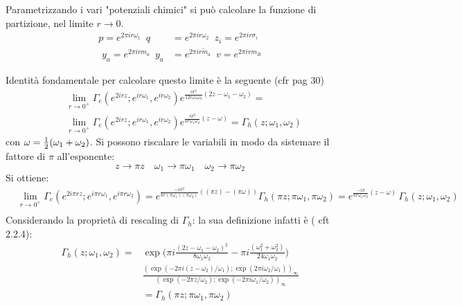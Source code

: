 \documentclass[a4paper,12pt]{report}
\begin{document}
Parametrizzando i vari "potenziali chimici" si può calcolare la funzione di partizione, nel limite $ r \rightarrow 0$.\\
$$
\begin{aligned}
p = e^{ 2 \pi i r  \omega_1 } \, \, \,  q &= e^{ 2 \pi i r \omega_2 } \,  \, \, z_i = e^{ 2 \pi i r \sigma_i } \\ 
\, \, y_a = e^{ 2 \pi i r m_a } \, \,  \, 
y_a &= e^{ 2 \pi i r  {\tilde m_a} } \, \, \,  v = e^{ 2 \pi i r m_B}
\label{fugacities_redefined}
\end{aligned}
$$

Identità fondamentale per calcolare questo limite è la seguente (cfr \citep{vanDeBult:2007} pag 30)
\begin{align*}
&\lim_{r \rightarrow 0^+} \Gamma_e (e^{ 2 i r z}; e^{ i  r \omega_1} , e^{i r  \omega_2})
 e^{\frac{ i \pi^2 }{12  r \omega_1 \omega_2 } ( 2 z - \omega_1 -\omega_2)} =\\
&\lim_{r \rightarrow 0^+} \Gamma_e (e^{ 2 i r z}; e^{ i  r \omega_1} , e^{i r  \omega_2}) 
 e^{\frac{ i \pi^2 }{6 r \omega_1 \omega_2 } (  z - \omega )} = \Gamma_h(z;\omega_1 , \omega_2)
\end{align*}
con $ \omega = {1 \over 2 } ( \omega_1 + \omega_2)$.
Si possono riscalare le variabili in modo da sistemare il fattore di $\pi$ all'esponente:
$$
 z \rightarrow \pi z \quad  \omega_1 \rightarrow  \pi \omega_1 \quad  \omega_2 \rightarrow  \pi \omega_2 
$$
Si ottiene:
\begin{align*}
&\lim_{r \rightarrow 0^+} \Gamma_e (e^{ 2 i \pi r z}; e^{ i \pi  r \omega_1} , e^{i \pi r  \omega_2}) =
 e^{\frac{ - i \pi^2 }{6 r  (\pi \omega_1) (\pi \omega_2) } ( (\pi z) - (\pi \omega))}\Gamma_h(\pi z; \pi \omega_1 ,\pi \omega_2) =   e^{\frac{ - i \pi }{6 r \omega_1 \omega_2 } (  z - \omega )} \, \Gamma_h ( z; \omega_1 , \omega_2 ) \\
\end{align*}
Considerando la proprietà di rescaling di $\Gamma_h$: la sua definizione infatti è ( cft \citep{vanDeBult:2007} 2.2.4):
\begin{align*}
 \Gamma_h ( z;\omega_1, \omega_2) =& \exp \bigg( \pi i \frac{(2z-\omega_1 - \omega_2)^2}{8 \omega_1 \omega_2 } - \pi i \frac{(\omega_1^2 + \omega_2^2)}{ 24 \omega_1 \omega_2} \bigg) \\
 & \frac{ (\exp( -2 \pi i (z-\omega_2)/ \omega_1 ); \exp( 2 \pi i \omega_2 / \omega_1 ))_{\infty}}
 { (\exp( -2 \pi z / \omega_2 ); \exp( - 2 \pi i \omega_1 / \omega_2))_{\infty}}\\
 & = \Gamma_h ( \pi z; \pi \omega_1, \pi \omega_2)
\end{align*}
\end{document}
